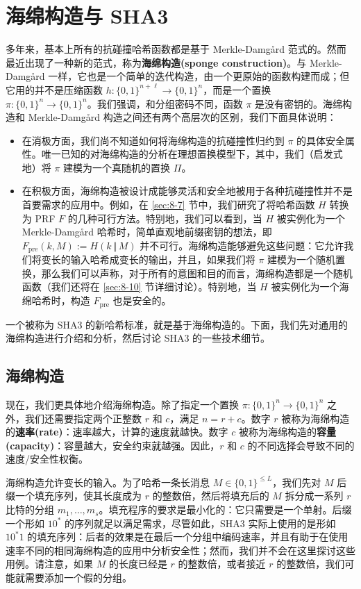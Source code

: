 \section{海绵构造与 SHA3}\label{sec:8-8}

多年来，基本上所有的抗碰撞哈希函数都是基于 Merkle-Damg{\aa}rd 范式的。然而最近出现了一种新的范式，称为\textbf{海绵构造(sponge construction)}。与 Merkle-Damg{\aa}rd 一样，它也是一个简单的迭代构造，由一个更原始的函数构建而成；但它用的并不是压缩函数 $h:\{0,1\}^{n+\ell}\to\{0,1\}^n$，而是一个置换 $\pi:\{0,1\}^n\to\{0,1\}^n$。我们强调，和分组密码不同，函数 $\pi$ 是没有密钥的。海绵构造和 Merkle-Damg{\aa}rd 构造之间还有两个高层次的区别，我们下面具体说明：
\begin{itemize}
	\item 在消极方面，我们尚不知道如何将海绵构造的抗碰撞性归约到 $\pi$ 的具体安全属性。唯一已知的对海绵构造的分析在理想置换模型下，其中，我们（启发式地）将 $\pi$ 建模为一个真随机的置换 $\Pi$。
	\item 在积极方面，海绵构造被设计成能够灵活和安全地被用于各种抗碰撞性并不是首要需求的应用中。例如，在 \ref{sec:8-7} 节中，我们研究了将哈希函数 $H$ 转换为 PRF $F$ 的几种可行方法。特别地，我们可以看到，当 $H$ 被实例化为一个 Merkle-Damg{\aa}rd 哈希时，简单直观地前缀密钥的想法，即 $F_\mathrm{pre}(k,M):=H(k\,\Vert\,M)$ 并不可行。海绵构造能够避免这些问题：它允许我们将变长的输入哈希成变长的输出，并且，如果我们将 $\pi$ 建模为一个随机置换，那么我们可以声称，对于所有的意图和目的而言，海绵构造都是一个随机函数（我们还将在 \ref{sec:8-10} 节详细讨论）。特别地，当 $H$ 被实例化为一个海绵哈希时，构造 $F_\mathrm{pre}$ 也是安全的。
\end{itemize}

一个被称为 SHA3 的新哈希标准，就是基于海绵构造的。下面，我们先对通用的海绵构造进行介绍和分析，然后讨论 SHA3 的一些技术细节。

\subsection{海绵构造}\label{subsec:8-8-1}

现在，我们更具体地介绍海绵构造。除了指定一个置换 $\pi:\{0,1\}^n\to\{0,1\}^n$ 之外，我们还需要指定两个正整数 $r$ 和 $c$，满足 $n=r+c$。数字 $r$ 被称为海绵构造的\textbf{速率(rate)}：速率越大，计算的速度就越快。数字 $c$ 被称为海绵构造的\textbf{容量(capacity)}：容量越大，安全约束就越强。因此，$r$ 和 $c$ 的不同选择会导致不同的速度/安全性权衡。

海绵构造允许变长的输入。为了哈希一条长消息 $M\in\{0,1\}^{\leq L}$，我们先对 $M$ 后缀一个填充序列，使其长度成为 $r$ 的整数倍，然后将填充后的 $M$ 拆分成一系列 $r$ 比特的分组 $m_1,\dots,m_s$。填充程序的要求是最小化的：它只需要是一个单射。后缀一个形如 $10^*$ 的序列就足以满足需求，尽管如此，SHA3 实际上使用的是形如 $10^*1$ 的填充序列：后者的效果是在最后一个分组中编码速率，并且有助于在使用速率不同的相同海绵构造的应用中分析安全性；然而，我们并不会在这里探讨这些用例。请注意，如果 $M$ 的长度已经是 $r$ 的整数倍，或者接近 $r$ 的整数倍，我们可能就需要添加一个假的分组。


